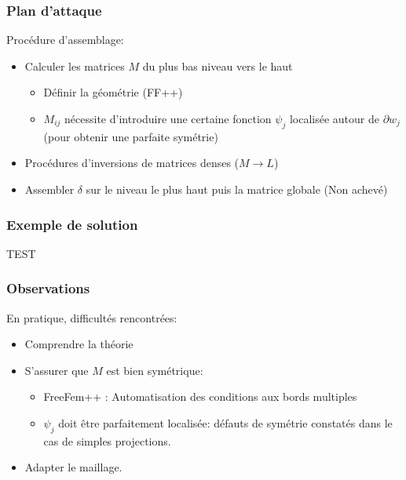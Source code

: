 \begin{frame}
  \frametitle{Plan d'attaque}
  Procédure d'assemblage:
  \begin{itemize}
  \item Calculer les matrices $M$ du plus bas niveau vers le haut
    \begin{itemize}
    \item Définir la géométrie (FF++) 
    \item $M_{ij}$ nécessite d'introduire une certaine fonction $\psi_j$ localisée autour de $\partial w_j$ (pour obtenir une parfaite symétrie)
    \end{itemize}
  \item Procédures d'inversions de matrices denses ($M \to L$)
  \item Assembler $\delta$ sur le  niveau le plus haut puis la  matrice globale (Non achevé)
  \end{itemize}
\end{frame}

\begin{frame}
\frametitle{Exemple de solution}
TEST
\end{frame}

\begin{frame}
  \frametitle{Observations}
  En pratique, difficultés rencontrées:
  \begin{itemize}
  \item Comprendre la théorie
  \item S'assurer que $M$ est bien symétrique:
    \begin{itemize}
    \item FreeFem++ : Automatisation des conditions aux bords multiples
    \item $\psi_j$ doit être parfaitement localisée: défauts de symétrie constatés dans le cas de simples projections.
    \end{itemize}
  \item Adapter le maillage.
  \end{itemize}
\end{frame}

